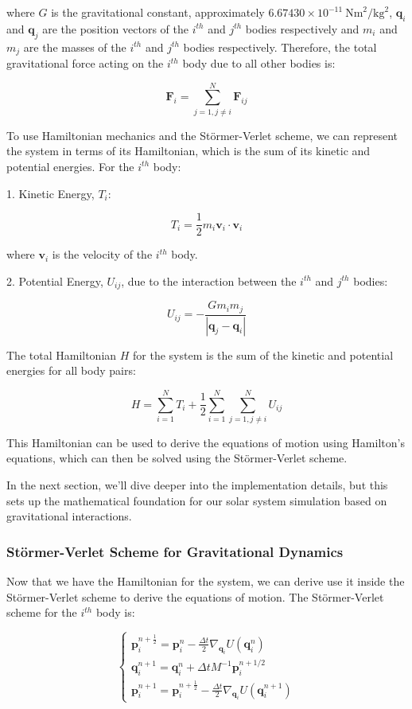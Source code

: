 \documentclass{article}
\begin{document}
where \(G\) is the gravitational constant, approximately \(6.67430 \times 10^{-11} \ \text{Nm}^2/\text{kg}^2\), \(\mathbf{q}_i\) and \(\mathbf{q}_j\) are the position vectors of the \(i^{th}\) and \(j^{th}\) bodies respectively and \(m_i\) and \(m_j\) are the masses of the \(i^{th}\) and \(j^{th}\) bodies respectively. Therefore, the total gravitational force acting on the \(i^{th}\) body due to all other bodies is:

\[
	\mathbf{F}_i = \sum_{j=1, j\neq i}^{N} \mathbf{F}_{ij}
\]

To use Hamiltonian mechanics and the Störmer-Verlet scheme, we can represent the system in terms of its Hamiltonian, which is the sum of its kinetic and potential energies. For the \(i^{th}\) body:

1. Kinetic Energy, \(T_i\):

\[
	T_i = \frac{1}{2} m_i \mathbf{v}_i \cdot \mathbf{v}_i
\]

where \(\mathbf{v}_i\) is the velocity of the \(i^{th}\) body.

2. Potential Energy, \(U_{ij}\), due to the interaction between the \(i^{th}\) and \(j^{th}\) bodies:

\[
	U_{ij} = -\frac{G m_i m_j}{|\mathbf{q}_j - \mathbf{q}_i|}
\]

The total Hamiltonian \(H\) for the system is the sum of the kinetic and potential energies for all body pairs:

\[
	H = \sum_{i=1}^{N} T_i + \frac{1}{2} \sum_{i=1}^{N} \sum_{j=1, j\neq i}^{N} U_{ij}
\]

This Hamiltonian can be used to derive the equations of motion using Hamilton's equations, which can then be solved using the Störmer-Verlet scheme.

In the next section, we'll dive deeper into the implementation details, but this sets up the mathematical foundation for our solar system simulation based on gravitational interactions.

\subsubsection{Störmer-Verlet Scheme for Gravitational Dynamics}
\label{sec:stormer_verlet_scheme_gravitational_dynamics}

Now that we have the Hamiltonian for the system, we can derive use it inside the Störmer-Verlet scheme to derive the equations of motion. The Störmer-Verlet scheme for the \(i^{th}\) body is:

\[
	\begin{cases}
		\mathbf{p}_i^{n + \frac{1}{2}} = \mathbf{p}_i^n - \frac{\Delta t}{2} \nabla_{\mathbf{q}_i} U(\mathbf{q}^n_i) \\
		\mathbf{q}_i^{n+1} = \mathbf{q}_i^{n} + \Delta t M^{-1} \mathbf{p}_i^{n+1/2} \\
		\mathbf{p}_i^{n+1} = \mathbf{p}_i^{n+\frac{1}{2}} - \frac{\Delta t}{2} \nabla_{\mathbf{q}_i} U(\mathbf{q}^{n+1}_i)
	\end{cases}
\]
\end{document}
